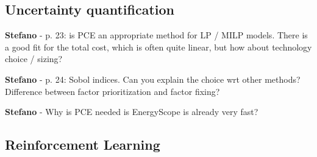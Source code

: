 \documentclass[12pt,a4paper]{article}
\begin{document}
\noindent 

\begin{mdframed}[style=manuscript] %

\end{mdframed}

\subsection{Uncertainty quantification}
\label{methodo_UQ}

\begin{mdframed}[style=comment] %
{\color{orange} \textbf{Stefano}} - p. 23: is PCE an appropriate method for LP / MILP models. There is a good fit for the total cost, which is often quite linear, but how about technology choice / sizing?
\end{mdframed}

\noindent 

\begin{mdframed}[style=manuscript] %

\end{mdframed}

\begin{mdframed}[style=comment] %
{\color{orange} \textbf{Stefano}} - p. 24: Sobol indices. Can you explain the choice wrt other methods? Difference between factor prioritization and factor fixing?
\end{mdframed}

\noindent 

\begin{mdframed}[style=manuscript] %

\end{mdframed}

\begin{mdframed}[style=comment] %
{\color{orange} \textbf{Stefano}} - Why is PCE needed is EnergyScope is already very fast?
\end{mdframed}

\noindent 

\begin{mdframed}[style=manuscript] %

\end{mdframed}

\subsection{Reinforcement Learning}
\label{methodo_RL}
\end{document}
